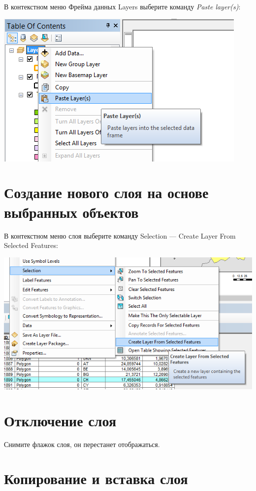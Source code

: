 \documentclass[12pt,]{book}
\begin{document}
В контекстном меню Фрейма данных Layers выберите команду \emph{Paste layer(s)}:

\includegraphics{images/Appendix/image12.png}

\hypertarget{section-16}{%
\section{Создание нового слоя на основе выбранных объектов}\label{section-16}}

В контекстном меню слоя выберите команду Selection --- Create Layer From Selected Features:

\includegraphics{images/Appendix/image13.png}

\hypertarget{section-17}{%
\section{Отключение слоя}\label{section-17}}

Снимите флажок слоя, он перестанет отображаться.

\hypertarget{section-18}{%
\section{Копирование и вставка слоя}\label{section-18}}
\end{document}
